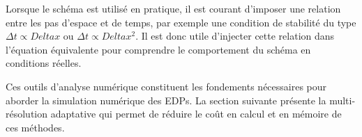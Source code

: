         Lorsque le schéma est utilisé en pratique, il est courant d'imposer une relation entre les pas d'espace et de temps, par exemple une condition de stabilité du type
        $\Delta t \propto Delta x$ ou $\Delta t \propto Delta x^2$.
        Il est donc utile d'injecter cette relation dans l'équation équivalente pour comprendre le comportement du schéma en conditions réelles.

        Ces outils d'analyse numérique constituent les fondements nécessaires pour aborder la simulation numérique des EDPs. La section suivante présente la multi-résolution adaptative qui permet de réduire le coût en calcul et en mémoire de ces méthodes.